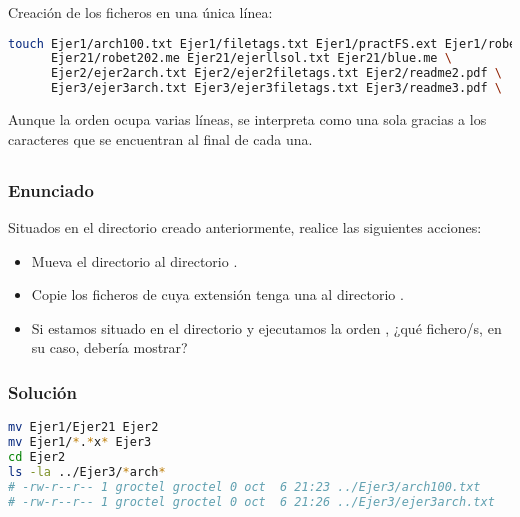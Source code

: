 Creación de los ficheros en una única línea:

\begin{lstlisting}[language=sh]
touch Ejer1/arch100.txt Ejer1/filetags.txt Ejer1/practFS.ext Ejer1/robet201.me \
      Ejer21/robet202.me Ejer21/ejerllsol.txt Ejer21/blue.me \
      Ejer2/ejer2arch.txt Ejer2/ejer2filetags.txt Ejer2/readme2.pdf \
      Ejer3/ejer3arch.txt Ejer3/ejer3filetags.txt Ejer3/readme3.pdf \
\end{lstlisting}

Aunque la orden \code{touch} ocupa varias líneas, se interpreta como una sola gracias a los caracteres \code{\\} que se encuentran al final de cada una.

\subsection{}\label{ej1-2}

\subsubsection{Enunciado}

Situados en el directorio  creado anteriormente, realice las siguientes acciones:

\begin{itemize}
	\item Mueva el directorio  al directorio .
	\item Copie los ficheros de \code{Ejer1} cuya extensión tenga una \code{x} al directorio .
	\item Si estamos situado en el directorio  y ejecutamos la orden , ¿qué fichero/s, en su caso, debería mostrar?
\end{itemize}

\subsubsection{Solución}

\begin{lstlisting}[language=sh]
mv Ejer1/Ejer21 Ejer2
mv Ejer1/*.*x* Ejer3
cd Ejer2
ls -la ../Ejer3/*arch*
# -rw-r--r-- 1 groctel groctel 0 oct  6 21:23 ../Ejer3/arch100.txt
# -rw-r--r-- 1 groctel groctel 0 oct  6 21:26 ../Ejer3/ejer3arch.txt
\end{lstlisting}

\subsection{}\label{ej1-3}

